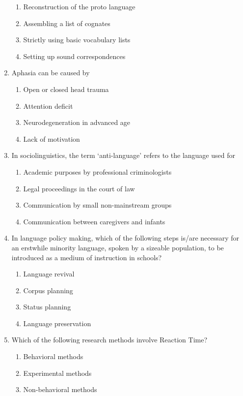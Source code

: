 \documentclass[12pt]{article}
\theoremstyle{remark}
\begin{document}
\begin{enumerate}
\begin{enumerate} 
\item Reconstruction of the proto language
\item Assembling a list of cognates
\item Strictly using basic vocabulary lists
\item Setting up sound correspondences
\end{enumerate}
\hfill{}
\item Aphasia can be caused by
\begin{enumerate} 
\item Open or closed head trauma
\item Attention deficit
\item Neurodegeneration in advanced age
\item Lack of motivation
\end{enumerate}
\hfill{}
\item In sociolinguistics, the term ‘anti-language’ refers to the language used for
\begin{enumerate} 
\item Academic purposes by professional criminologists
\item Legal proceedings in the court of law
\item Communication by small non-mainstream groups
\item Communication between caregivers and infants
\end{enumerate}
\hfill{}
\item In language policy making, which of the following steps is/are necessary for an erstwhile minority language, spoken by a sizeable population, to be introduced as a medium of instruction in schools?
\begin{enumerate} 
\item Language revival
\item Corpus planning
\item Status planning
\item Language preservation
\end{enumerate}
\hfill{}
\item Which of the following research methods involve Reaction Time?
\begin{enumerate} 
\item Behavioral methods
\item Experimental methods
\item Non-behavioral methods

\end{enumerate}
\end{enumerate}
\end{document}
